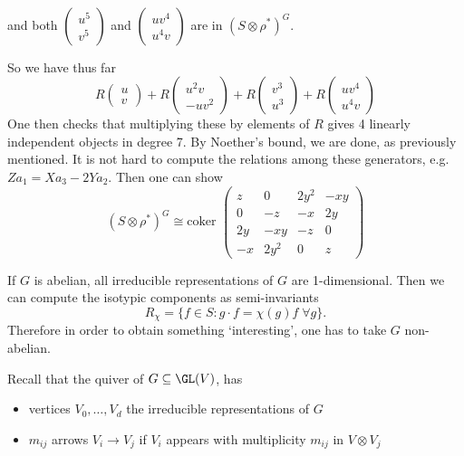 \begin{ex}
\[\begin{split}
	\end{split}
	\]
and both $\begin{pmatrix} u^5 \\ v^5 \end{pmatrix}$ and $\begin{pmatrix} uv^4 \\ u^4v \end{pmatrix}$ are in $(S \otimes \rho^*)^G$. %

So we have thus far
	\[
	R \begin{pmatrix} u \\ v \end{pmatrix} + R \begin{pmatrix} u^2v \\ -uv^2 \end{pmatrix} + R \begin{pmatrix}  v^3 \\ u^3 \end{pmatrix} + R \begin{pmatrix} uv^4 \\ u^4v \end{pmatrix}
	\]
One then checks that multiplying these by elements of $R$ gives 4 linearly independent objects in degree 7. By Noether's bound, we are done, as previously mentioned. It is not hard to compute the relations among these generators, e.g. $Za_1= Xa_3 - 2Y a_2$. Then one can show 
	\[
	(S \otimes \rho^*)^G \cong \text{coker } 
	\begin{pmatrix}
	z & 0 & 2y^2 & -xy \\
	0 & -z & -x & 2y \\
	2y & -xy & -z & 0 \\
	-x & 2y^2 & 0 & z
	\end{pmatrix}
	\] \xqed
\end{ex}


\begin{rem}
If $G$ is abelian, all irreducible representations of $G$ are 1-dimensional. Then we can compute the isotypic components as semi-invariants
	\[
	R_\chi= \{ f \in S \colon g\cdot f= \chi(g) f \;\forall g \}.
	\]
Therefore in order to obtain something `interesting', one has to take $G$ non-abelian. 
\end{rem}


Recall that the \mc quiver of $G \subseteq \GL(V)$, has
	\begin{itemize}
	\item vertices $V_0,\ldots,V_d$ the irreducible representations of $G$
	\item $m_{ij}$ arrows $V_i \to V_j$ if $V_i$ appears with multiplicity $m_{ij}$ in $V \otimes V_j$
	\end{itemize}


